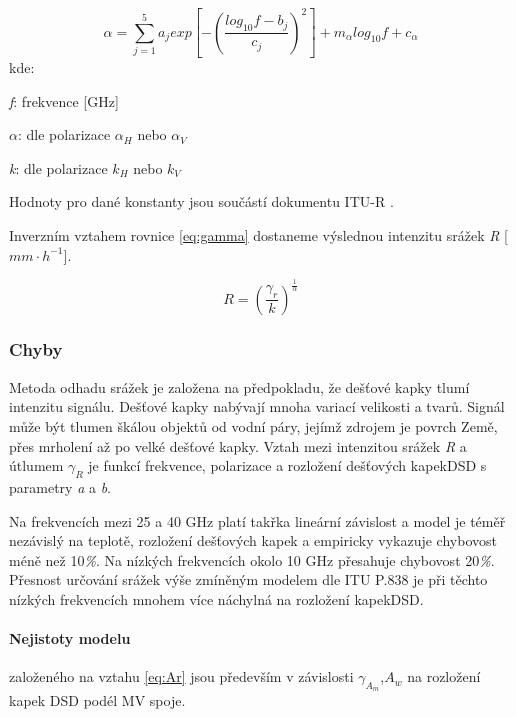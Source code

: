 \documentclass[a4paper,12pt,oneside]{report}
\begin{document}
\begin{equation}
\alpha=\sum_{j=1}^{5} a_{j} exp\left [ -\left ( \frac{log_{10}f-b_{j}}{c_{j}} \right )^{2} \right ]+m{_{\alpha }}log_{10}f+c_{\alpha }
\end{equation}
kde:

\emph{f}: frekvence [GHz]

\emph{$\alpha$}:  dle polarizace \emph{$\alpha_{H}$} nebo \emph{$\alpha_{V}$}

\emph{k}: dle polarizace  \emph{$k_{H}$} nebo \emph{$k_{V}$}

{\raggedright{}Hodnoty pro dané konstanty jsou součástí dokumentu ITU-R \cite{itu}.}
\bigskip

{\raggedright{}Inverzním vztahem rovnice \eqref{eq:gamma} dostaneme výslednou intenzitu srážek \emph{R} [$mm \cdot h^{-1}$]. }


\begin{equation}
R=\left ( \frac{\gamma_{r}}{k} \right )^{\frac{1}{\alpha }}
\end{equation}


\subsubsection{Chyby}
\label{subsec:chyby}
Metoda odhadu srážek je založena na předpokladu, že dešťové kapky tlumí intenzitu signálu. Dešťové kapky nabývají mnoha variací velikosti a tvarů. Signál může být tlumen škálou objektů od vodní páry, jejímž zdrojem je povrch Země, přes mrholení až po velké dešťové kapky. Vztah mezi intenzitou srážek \emph{R} a útlumem \emph{$\gamma_{R} $} je funkcí frekvence, polarizace a rozložení dešťových kapek\acs{DSD} s parametry \emph{a} a \emph{b}. 

Na frekvencích mezi 25 a 40 GHz platí takřka lineární závislost a model je téměř nezávislý na teplotě, rozložení dešťových kapek a empiricky vykazuje chybovost méně než 10\emph{\%}. Na nízkých frekvencích okolo 10 GHz přesahuje chybovost 20\emph{\%}. Přesnost určování srážek výše zmíněným modelem dle ITU P.838 je při těchto nízkých frekvencích mnohem více náchylná na rozložení kapek\acs{DSD}.\cite{dsd} 


\paragraph*{Nejistoty modelu} založeného na vztahu \eqref{eq:Ar} jsou především v závislosti \emph{$\gamma_{A_{m}} $},\emph{$A_{w} $} na rozložení kapek \acs{DSD} podél MV spoje.
\end{document}

